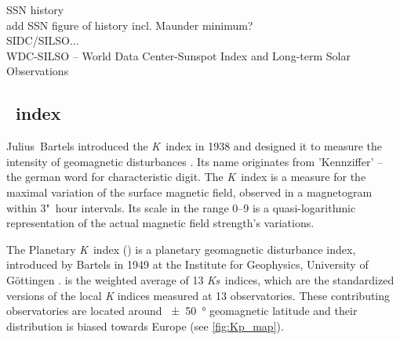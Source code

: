 SSN history\\
add SSN figure of history incl. Maunder minimum?\\

SIDC/SILSO...\\
WDC-SILSO -- World Data Center-Sunspot Index and Long-term Solar Observations\\


\subsection{\Kp{}~index}
\label{sec:kp_index}
Julius~Bartels introduced the \textit{K}~index in 1938 and designed it to measure the intensity of geomagnetic disturbances \citep{Bartels1939}. Its name originates from 'Kennziffer' -- the german word for characteristic digit. The \textit{K}~index is a measure for the maximal variation of the surface magnetic field, observed in a magnetogram within 3"~hour intervals. Its scale in the range 0--9 is a quasi-logarithmic representation of the actual magnetic field strength's variations.

The Planetary \textit{K}~index (\Kp{}) is a planetary geomagnetic disturbance index, introduced by Bartels in 1949 at the Institute for Geophysics, University of Göttingen \citep{Bartels1949}. \Kp{} is the weighted average of 13 \textit{Ks}~indices, which are the standardized versions of the local \textit{K} indices measured at 13 observatories. These contributing observatories are located around \SI{+-50}{\degree} geomagnetic latitude and their distribution is biased towards Europe (see \autoref{fig:Kp_map}).
\begin{figure}[htb]
\end{figure}

